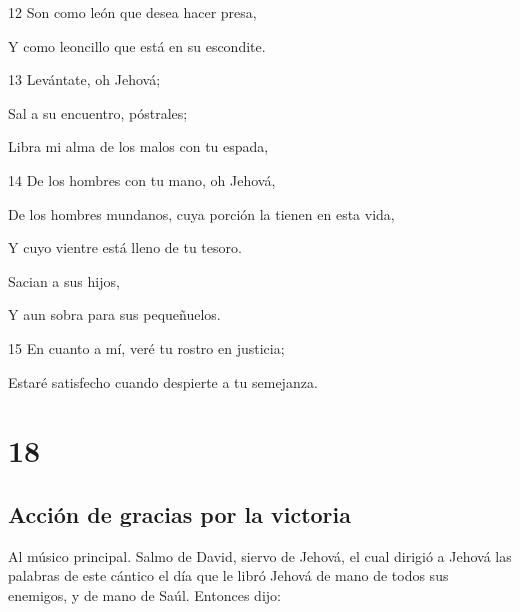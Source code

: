 \par 12 Son como león que desea hacer presa,
\par Y como leoncillo que está en su escondite.
\par 13 Levántate, oh Jehová;
\par Sal a su encuentro, póstrales;
\par Libra mi alma de los malos con tu espada,
\par 14 De los hombres con tu mano, oh Jehová,
\par De los hombres mundanos, cuya porción la tienen en esta vida,
\par Y cuyo vientre está lleno de tu tesoro.
\par Sacian a sus hijos,
\par Y aun sobra para sus pequeñuelos.
\par 15 En cuanto a mí, veré tu rostro en justicia;
\par Estaré satisfecho cuando despierte a tu semejanza.

\chapter{18}

\section*{Acción de gracias por la victoria}

\par Al músico principal. Salmo de David, siervo de Jehová, el cual dirigió a Jehová las palabras de este cántico el día que le libró Jehová de mano de todos sus enemigos, y de mano de Saúl. Entonces dijo:

